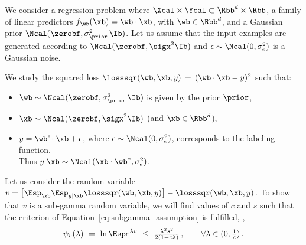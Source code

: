 \documentclass{article}
\theoremstyle{definition}
\theoremstyle{plain}
\begin{document}
\newcommand{\mzx}{\mu_{z|\xb}}
\newcommand{\szx}{\sigma_{z|\xb}}
\newcommand{\mbar}{\bar\mu}
\newcommand{\sbar}{\bar\sigma}


We consider a regression problem where $\Xcal\times\Ycal \subset \Rbb^d\times\Rbb$, a family of linear predictors $f_\wb(\xb) = \wb\cdot\xb$, with $\wb\in\Rbb^d$, and a Gaussian prior 
$\Ncal(\zerobf, \sigma_\prior^2\,\Ib)$.  
Let us assume that the input examples 
are generated according to $\Ncal(\zerobf, \sigx^2\Ib)$
%
and  $\epsilon\sim\Ncal(0,\sigma_\epsilon^2)$ is a Gaussian noise.

%
We study the squared loss $\losssqr(\wb,\xb,y) \, =\, (\wb\cdot\xb-y)^2$ such that:
\begin{itemize}
	\item $\wb \sim \Ncal(\zerobf, \sigma_\prior^2\,\Ib)$ is given by the prior $\prior$, 
%
	\item $\xb\sim  \Ncal(\zerobf, \sigx^2\Ib)$ (and $\xb\in\Rbb^d$),
	\item $y = \wb^* \!\cdot \xb + \epsilon$, where $\epsilon\sim\Ncal(0,\sigma_\epsilon^2)$, corresponds to the labeling function.\\
	Thus $y|\xb\sim\Ncal (\xb\cdot \wb^*, \sigma_\epsilon^2)$.
\end{itemize}


Let us consider the random variable $v = \big[ \Esp_\xb \Esp_{y|\xb} \losssqr(\wb,\xb,y)  \big] - \losssqr(\wb,\xb,y)$.
To show that $v$ is a sub-gamma random variable, we will find  values of $c$ and $s$ such that the criterion of Equation~\eqref{eq:subgamma_assumption} is fulfilled, \ie,
\begin{equation*}
\psi_{v}(\lambda)
\ = \ \ln \Esp e^{\lambda v}
%
\ \leq \ {\tfrac{\lambda^2 s^2}{2(1-c\lambda)}}\,,  \qquad \forall \lambda  \in (0, \tfrac1c)\,.
\end{equation*}

%
%
%
%
%
%
%
%
%
%
%
%
%
%
%
%
%
%
%
%
%
%
%
%
%
%
%
%
%
%
%
%
%
%
%
%
%
%
%
%
%
%
%
%
%
%
%
%
%
%
%
%
%
%
%
%
%

%
%
%
%
%
%
%
%
%
%
%
%
%
%
%
%
%
%
%
%
%
%
%
%
%
%
%
%
%
%
\end{document}
